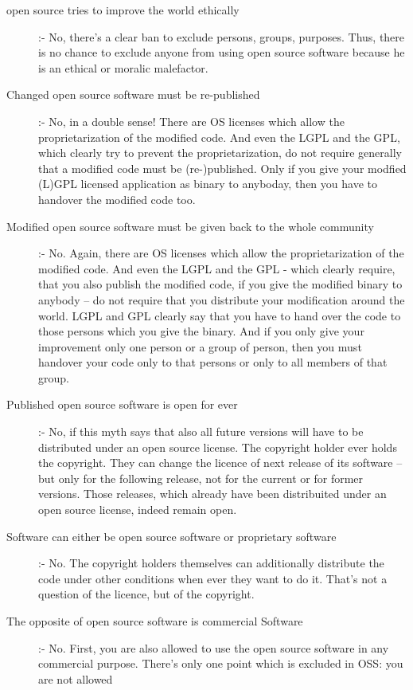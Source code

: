 \begin{description}
  \item[open source tries to improve the world ethically] :- No, there's a clear
  ban to exclude persons, groups, purposes. Thus, there is no chance to exclude
  anyone from using open source software because he is an ethical or moralic
  malefactor.
  \item[Changed open source software must be re-published] :- No, in a double
  sense! There are OS licenses which allow the proprietarization of the
  modified code. And even the LGPL and the GPL, which clearly try to prevent
  the proprietarization, do not require generally that a modified code must be
  (re-)published. Only if you give your modfied (L)GPL licensed application as
  binary to anyboday, then you have to handover the modified code too.
  \item[Modified open source software must be given back to the whole community]
  :- No. Again, there are OS licenses which allow the proprietarization of the
  modified code. And even the LGPL and the GPL - which clearly require, that you
  also publish the modified code, if you give the modified binary to anybody --
  do not require that you distribute your modification around the world. LGPL and
  GPL clearly say that you have to hand over the code to those persons which you
  give the binary. And if you only give your improvement only one person or a
  group of person, then you must handover your code only to that persons or
  only to all members of that group.
  \item[Published open source software is open for ever] :- No, if this myth
  says that also all future versions will have to be distributed under an open
  source license. The copyright holder ever holds the copyright. They can change
  the licence of next release of its software -- but only for the following
  release, not for the current or for former versions. Those releases, which
  already have been distribuited under an open source license, indeed remain
  open.
  \item[Software can either be open source software or proprietary software] :-
  No. The copyright holders themselves can additionally distribute the code
  under other conditions when ever they want to do it. That's not a question of
  the licence, but of the copyright.  
  \item[The opposite of open source software is commercial Software] :- No.
  First, you are also allowed to use the open source software in any commercial
  purpose. There's only one point which is excluded in OSS: you are not allowed

\end{description}
